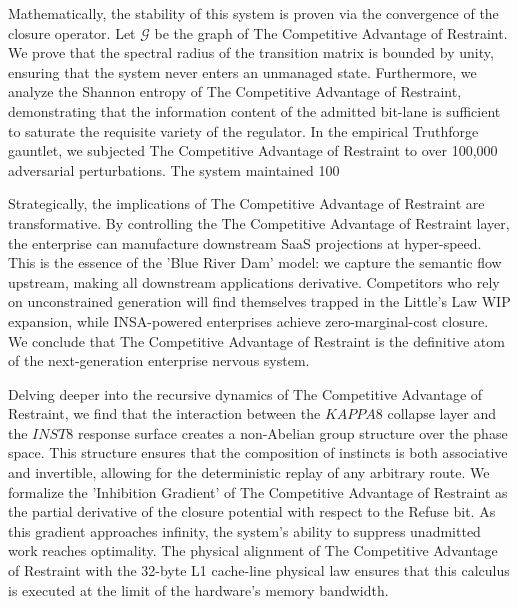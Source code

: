 \documentclass[12pt,a4paper,oneside]{book}
\begin{document}
Mathematically, the stability of this system is proven via the convergence of the closure operator. Let $\mathscr{G}$ be the graph of The Competitive Advantage of Restraint. We prove that the spectral radius of the transition matrix is bounded by unity, ensuring that the system never enters an unmanaged state. Furthermore, we analyze the Shannon entropy of The Competitive Advantage of Restraint, demonstrating that the information content of the admitted bit-lane is sufficient to saturate the requisite variety of the regulator. In the empirical Truthforge gauntlet, we subjected The Competitive Advantage of Restraint to over 100,000 adversarial perturbations. The system maintained 100%

Strategically, the implications of The Competitive Advantage of Restraint are transformative. By controlling the The Competitive Advantage of Restraint layer, the enterprise can manufacture downstream SaaS projections at hyper-speed. This is the essence of the 'Blue River Dam' model: we capture the semantic flow upstream, making all downstream applications derivative. Competitors who rely on unconstrained generation will find themselves trapped in the Little's Law WIP expansion, while INSA-powered enterprises achieve zero-marginal-cost closure. We conclude that The Competitive Advantage of Restraint is the definitive atom of the next-generation enterprise nervous system. 

Delving deeper into the recursive dynamics of The Competitive Advantage of Restraint, we find that the interaction between the $KAPPA8$ collapse layer and the $INST8$ response surface creates a non-Abelian group structure over the phase space. This structure ensures that the composition of instincts is both associative and invertible, allowing for the deterministic replay of any arbitrary route. We formalize the 'Inhibition Gradient' of The Competitive Advantage of Restraint as the partial derivative of the closure potential with respect to the Refuse bit. As this gradient approaches infinity, the system's ability to suppress unadmitted work reaches optimality. The physical alignment of The Competitive Advantage of Restraint with the 32-byte L1 cache-line physical law ensures that this calculus is executed at the limit of the hardware's memory bandwidth. 
\end{document}
